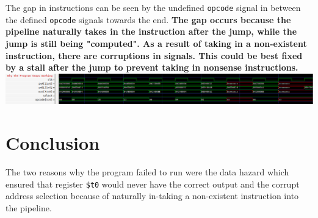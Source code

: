 \documentclass[twocolumn]{article}
\newcommand{\cc}[1]{\texttt{#1}}
\begin{document}
The gap in instructions can be seen by the undefined \cc{opcode} signal in between the defined \cc{opcode} signals towards the end. \textbf{The gap occurs because the pipeline naturally takes in the instruction after the jump, while the jump is still being "computed". As a result of taking in a non-existent instruction, there are corruptions in signals. This could be best fixed by a stall after the jump to prevent taking in nonsense instructions. }\\

\begingroup
    \centering
    \medskip
    \includegraphics[width=\columnwidth]{Lab-Tex/Lab6-images/p8.png}
    \medskip
\endgroup


\section{Conclusion}

The two reasons why the program failed to run were the data hazard which ensured that register \cc{\$t0} would never have the correct output and the corrupt address selection because of naturally in-taking a non-existent instruction into the pipeline.



\printbibliography
\end{document}
